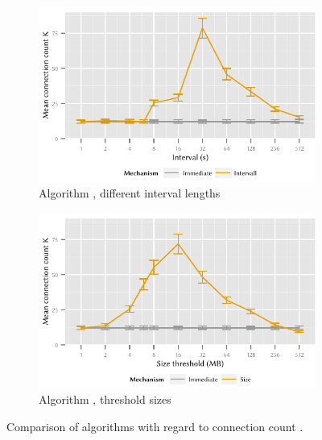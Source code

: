 \begin{figure}
	\begin{subfigure}[b]{\textwidth}
	\centering
	\includegraphics{application/cloud_file_synchronization/numerical_evaluation/figures/interval_connection}
	\caption{Algorithm \algointerval, different interval lengths}\label{fig:application:cloud_file_synchronisation:numerical_evaluation:connection:connection:interval}
	\end{subfigure} 
	\begin{subfigure}[b]{\textwidth}
	\centering
	\includegraphics{application/cloud_file_synchronization/numerical_evaluation/figures/size_connection}
	\caption{Algorithm \algosize, threshold sizes}\label{fig:application:cloud_file_synchronisation:numerical_evaluation:connection:connection:size}
	\end{subfigure}

	\caption{Comparison of algorithms with regard to connection count \connectionCount.}\label{fig:application:cloud_file_synchronisation:numerical_evaluation:connection:connection}
\end{figure}

